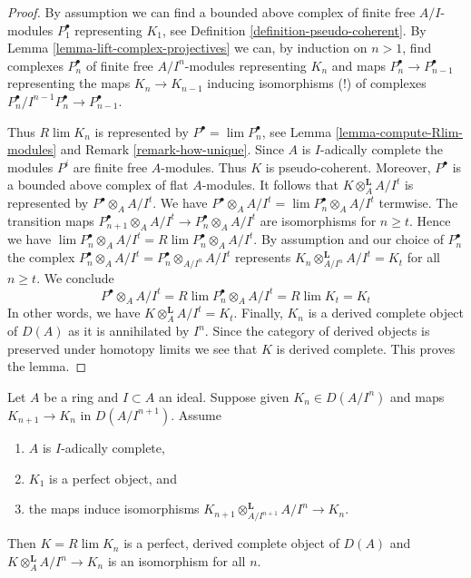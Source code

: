 \begin{proof}
By assumption we can find a bounded above complex of
finite free $A/I$-modules $P_1^\bullet$ representing $K_1$, see
Definition \ref{definition-pseudo-coherent}.
By Lemma \ref{lemma-lift-complex-projectives}
we can, by induction on $n > 1$, find
complexes $P_n^\bullet$ of finite free $A/I^n$-modules representing $K_n$
and maps $P_n^\bullet \to P_{n - 1}^\bullet$ representing the maps
$K_n \to K_{n - 1}$ inducing isomorphisms (!)
of complexes $P_n^\bullet/I^{n - 1}P_n^\bullet \to P_{n - 1}^\bullet$.

\medskip\noindent
Thus $R\lim K_n$ is represented by $P^\bullet = \lim P_n^\bullet$, see
Lemma \ref{lemma-compute-Rlim-modules} and
Remark \ref{remark-how-unique}.
Since $A$ is $I$-adically complete the modules $P^i$ are finite free
$A$-modules. Thus $K$ is pseudo-coherent.
Moreover, $P^\bullet$ is a bounded above complex of flat $A$-modules.
It follows that $K \otimes_A^\mathbf{L} A/I^t$ is represented by
$P^\bullet \otimes_A A/I^t$. We have
$P^\bullet \otimes_A A/I^t = \lim P_n^\bullet \otimes_A A/I^t$
termwise. The transition maps
$P_{n + 1}^\bullet \otimes_A A/I^t \to P_n^\bullet \otimes_A A/I^t$
are isomorphisms for $n \geq t$. Hence we have
$\lim P_n^\bullet \otimes_A A/I^t = R\lim P_n^\bullet \otimes_A A/I^t$.
By assumption and our choice of $P_n^\bullet$ the complex
$P_n^\bullet \otimes_A A/I^t = P_n^\bullet \otimes_{A/I^n} A/I^t$
represents $K_n \otimes_{A/I^n}^\mathbf{L} A/I^t = K_t$ for all $n \geq t$.
We conclude
$$
P^\bullet \otimes_A A/I^t =
R\lim P_n^\bullet \otimes_A A/I^t =
R\lim K_t = K_t
$$
In other words, we have $K \otimes_A^\mathbf{L} A/I^t = K_t$.
Finally, $K_n$ is a derived complete object of $D(A)$ as it is annihilated
by $I^n$. Since the category of derived objects is preserved under homotopy
limits we see that $K$ is derived complete. This proves the lemma.
\end{proof}

\begin{lemma}
\label{lemma-Rlim-perfect-gives-complete}
Let $A$ be a ring and $I \subset A$ an ideal.
Suppose given $K_n \in D(A/I^n)$ and maps $K_{n + 1} \to K_n$
in $D(A/I^{n + 1})$. Assume
\begin{enumerate}
\item $A$ is $I$-adically complete,
\item $K_1$ is a perfect object, and
\item the maps induce isomorphisms
$K_{n + 1} \otimes_{A/I^{n + 1}}^\mathbf{L} A/I^n \to K_n$.
\end{enumerate}
Then $K = R\lim K_n$ is a perfect, derived complete object of $D(A)$
and $K \otimes_A^\mathbf{L} A/I^n \to K_n$ is an isomorphism for all $n$.
\end{lemma}

